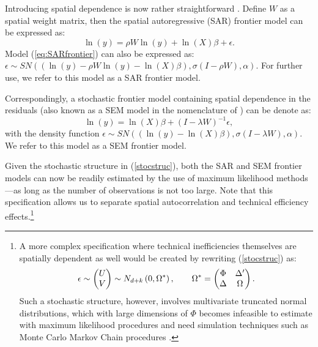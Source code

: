 \documentclass[11pt,parskip,abstracton,notitlepage]{scrartcl}
\begin{document}
Introducing spatial dependence is now rather straightforward \citep[see for further elaboration][]{ANSELIN1988A}. Define $W$ as a spatial weight matrix, then the spatial autoregressive (SAR) frontier model can be expressed as:
\begin{equation}
\ln (y) = \rho W \ln(y) + \ln \left(X\right) \beta + \epsilon.
\label{eq:SARfrontier}
\end{equation}
Model (\ref{eq:SARfrontier}) can also be expressed as: $\epsilon  \sim SN( \left(\ln \left(y\right)  -\rho W \ln(y) - \ln \left(X\right) \beta \right), \sigma \left(I - \rho W\right), \alpha)$. For further use, we refer to this model as a SAR frontier model.

Correspondingly, a stochastic frontier model containing spatial dependence in the residuals (also known as a SEM model in the nomenclature of \citet{LESAGE2009}) can be denote as: 
\begin{equation}
\ln (y) = \ln \left(X\right) \beta + (I - \lambda W)^{-1}\epsilon,
\label{eq:SEMfrontier}
\end{equation}
with the density function $\epsilon  \sim SN( \left(\ln \left(y\right) - \ln \left(X\right) \beta \right), \sigma \left(I - \lambda W\right), \alpha)$. We refer to this model as a SEM frontier model.

Given the stochastic structure in (\ref{stocstruc}), both the SAR and SEM frontier models can now be readily estimated by the use of maximum likelihood methods---as long as the number of observations is not too large. Note that this specification allows us to separate spatial autocorrelation and technical efficiency effects.\footnote{A more complex specification where technical inefficiencies themselves are spatially dependent as well would be created by rewriting (\ref{stocstruc}) as:
\begin{equation}
\epsilon   \sim \begin{pmatrix} U \\ V \end{pmatrix} \sim N_{d+k}\left(0,\Omega^\ast\right), \qquad \Omega^\ast=\begin{pmatrix} \Phi & \Delta' \\ \Delta & \Omega \end{pmatrix}.\notag
\label{eq:fullomega}
\end{equation}
Such a stochastic structure, however, involves multivariate truncated normal distributions, which with large dimensions of $\Phi$ becomes infeasible to estimate with maximum likelihood procedures and need simulation techniques such as Monte Carlo Markov Chain procedures \citep[see as well][]{DOMINGUEZMOLINA2007}.} 
\end{document}
